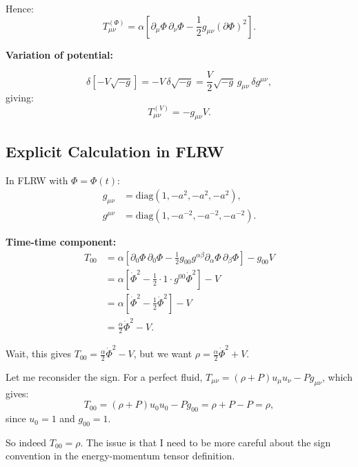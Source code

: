 \documentclass[11pt,a4paper]{article}
\numberwithin{equation}{section}
\theoremstyle{plain}
\theoremstyle{definition}
\theoremstyle{remark}
\begin{document}
Hence:
\begin{equation}
T_{\mu\nu}^{(\Phi)} = \alpha\left[\partial_\mu\Phi\,\partial_\nu\Phi - \frac{1}{2}g_{\mu\nu}(\partial\Phi)^2\right].
\end{equation}

\textbf{Variation of potential:}

\begin{equation}
\delta\left[-V\sqrt{-g}\right] = -V\,\delta\sqrt{-g} = \frac{V}{2}\sqrt{-g}\,g_{\mu\nu}\,\delta g^{\mu\nu},
\end{equation}
giving:
\begin{equation}
T_{\mu\nu}^{(V)} = -g_{\mu\nu}V.
\end{equation}

\subsection{Explicit Calculation in FLRW}

In FLRW with $\Phi = \Phi(t)$:
\begin{align}
g_{\mu\nu} &= \mathrm{diag}(1, -a^2, -a^2, -a^2),\\
g^{\mu\nu} &= \mathrm{diag}(1, -a^{-2}, -a^{-2}, -a^{-2}).
\end{align}

\textbf{Time-time component:}
\begin{align}
T_{00} &= \alpha\left[\partial_0\Phi\,\partial_0\Phi - \frac{1}{2}g_{00}g^{\alpha\beta}\partial_\alpha\Phi\,\partial_\beta\Phi\right] - g_{00}V\\
&= \alpha\left[\dot{\Phi}^2 - \frac{1}{2}\cdot 1\cdot g^{00}\dot{\Phi}^2\right] - V\\
&= \alpha\left[\dot{\Phi}^2 - \frac{1}{2}\dot{\Phi}^2\right] - V\\
&= \frac{\alpha}{2}\dot{\Phi}^2 - V.
\end{align}

Wait, this gives $T_{00} = \frac{\alpha}{2}\dot{\Phi}^2 - V$, but we want $\rho = \frac{\alpha}{2}\dot{\Phi}^2 + V$.

Let me reconsider the sign. For a perfect fluid, $T_{\mu\nu} = (\rho + P)u_\mu u_\nu - Pg_{\mu\nu}$, which gives:
\begin{equation}
T_{00} = (\rho + P)u_0 u_0 - Pg_{00} = \rho + P - P = \rho,
\end{equation}
since $u_0 = 1$ and $g_{00} = 1$.

So indeed $T_{00} = \rho$. The issue is that I need to be more careful about the sign convention in the energy-momentum tensor definition.
\end{document}
